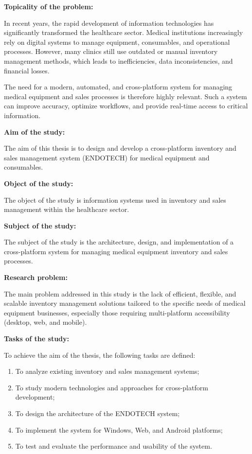 
\textbf{Topicality of the problem:}  

In recent years, the rapid development of information technologies has significantly transformed the healthcare sector. Medical institutions increasingly rely on digital systems to manage equipment, consumables, and operational processes. However, many clinics still use outdated or manual inventory management methods, which leads to inefficiencies, data inconsistencies, and financial losses.

The need for a modern, automated, and cross-platform system for managing medical equipment and sales processes is therefore highly relevant. Such a system can improve accuracy, optimize workflows, and provide real-time access to critical information.

\textbf{Aim of the study:}  

The aim of this thesis is to design and develop a cross-platform inventory and sales management system (ENDOTECH) for medical equipment and consumables.

\textbf{Object of the study:}  

The object of the study is information systems used in inventory and sales management within the healthcare sector.

\textbf{Subject of the study:}  

The subject of the study is the architecture, design, and implementation of a cross-platform system for managing medical equipment inventory and sales processes.

\textbf{Research problem:}  

The main problem addressed in this study is the lack of efficient, flexible, and scalable inventory management solutions tailored to the specific needs of medical equipment businesses, especially those requiring multi-platform accessibility (desktop, web, and mobile).

\textbf{Tasks of the study:}  

To achieve the aim of the thesis, the following tasks are defined:
\begin{enumerate}
    \item To analyze existing inventory and sales management systems;
    \item To study modern technologies and approaches for cross-platform development;
    \item To design the architecture of the ENDOTECH system;
    \item To implement the system for Windows, Web, and Android platforms;
    \item To test and evaluate the performance and usability of the system.
\end{enumerate}

